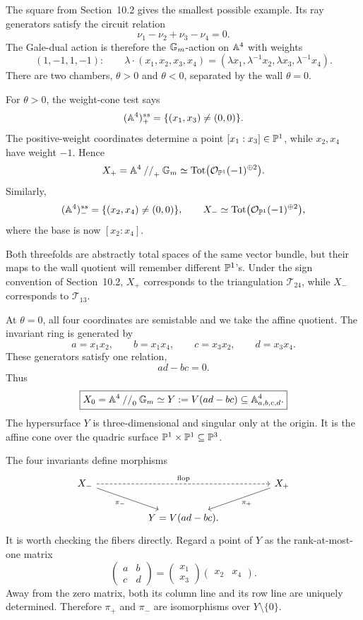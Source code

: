 The square from Section~10.2 gives the smallest possible example.  Its
ray generators satisfy the circuit relation
\[
\nu_1-\nu_2+\nu_3-\nu_4=0.
\]
The Gale-dual action is therefore the \(\mathbb{G}_{m}\)-action on \(\mathbb{A}^4\)
with weights
\[
(1,-1,1,-1):
\qquad
\lambda\cdot(x_1,x_2,x_3,x_4)
=
(\lambda x_1,\lambda^{-1}x_2,
 \lambda x_3,\lambda^{-1}x_4).
\]
There are two chambers, \(\theta>0\) and \(\theta<0\), separated by the
wall \(\theta=0\).

\begin{example}
For \(\theta>0\), the weight-cone test says
\[
(\mathbb{A}^4)^{ss}_+
=
\{(x_1,x_3)\neq(0,0)\}.
\]
The positive-weight coordinates determine a point
\([x_1:x_3]\in\mathbb{P}^1\), while \(x_2,x_4\) have weight \(-1\).  Hence
\[
X_+
=
\mathbb{A}^4\mathbin{//}_{+}\mathbb{G}_{m}
\simeq
\operatorname{Tot}
\bigl(\mathcal O_{\mathbb{P}^1}(-1)^{\oplus2}\bigr).
\]
Similarly,
\[
(\mathbb{A}^4)^{ss}_-
=
\{(x_2,x_4)\neq(0,0)\},
\qquad
X_-
\simeq
\operatorname{Tot}
\bigl(\mathcal O_{\mathbb{P}^1}(-1)^{\oplus2}\bigr),
\]
where the base is now \([x_2:x_4]\).

Both threefolds are abstractly total spaces of the same vector bundle,
but their maps to the wall quotient will remember different
\(\mathbb{P}^1\)'s.  Under the sign convention of Section~10.2, \(X_+\)
corresponds to the triangulation \(\mathcal T_{24}\), while \(X_-\)
corresponds to \(\mathcal T_{13}\).
\end{example}

\begin{example}
At \(\theta=0\), all four coordinates are semistable and we take the
affine quotient.  The invariant ring is generated by
\[
a=x_1x_2,
\qquad
b=x_1x_4,
\qquad
c=x_3x_2,
\qquad
d=x_3x_4.
\]
These generators satisfy one relation,
\[
ad-bc=0.
\]
Thus
\[
\boxed{
X_0
=
\mathbb{A}^4\mathbin{//}_0\mathbb{G}_{m}
\simeq
Y:=V(ad-bc)\subseteq\mathbb{A}^4_{a,b,c,d}.}
\]
The hypersurface \(Y\) is three-dimensional and singular only at the
origin.  It is the affine cone over the quadric surface
\(\mathbb{P}^1\times\mathbb{P}^1\subseteq\mathbb{P}^3\).
\end{example}

The four invariants define morphisms
\[
\begin{tikzcd}[column sep=huge]
X_-
  \arrow[dr,"\pi_-"']
  \arrow[rr,dashed,"\text{flop}"]
&&
X_+
  \arrow[dl,"\pi_+"]
\\
&Y=V(ad-bc).&
\end{tikzcd}
\]
It is worth checking the fibers directly.  Regard a point of \(Y\) as
the rank-at-most-one matrix
\[
\begin{pmatrix}
a&b\\
c&d
\end{pmatrix}
=
\begin{pmatrix}x_1\\x_3\end{pmatrix}
\begin{pmatrix}x_2&x_4\end{pmatrix}.
\]
Away from the zero matrix, both its column line and its row line are
uniquely determined.  Therefore \(\pi_+\) and \(\pi_-\) are
isomorphisms over \(Y\setminus\{0\}\).

